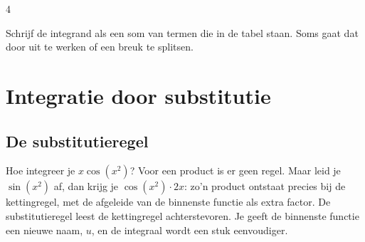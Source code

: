 \begin{alleenvoor}{4}

\end{alleenvoor}
\begin{werkwijze}
Schrijf de integrand als een som van termen die in de tabel staan. Soms gaat dat door uit te werken of een breuk te splitsen.
\end{werkwijze}


\begin{oefeningen}
\end{oefeningen}

\section{Integratie door substitutie}

\subsection{De substitutieregel}

Hoe integreer je $x\cos(x^2)$? Voor een product is er geen regel. Maar leid je $\sin(x^2)$ af, dan krijg je $\cos(x^2) \cdot 2x$: zo'n product ontstaat precies bij de kettingregel, met de afgeleide van de binnenste functie als extra factor. De substitutieregel leest de kettingregel achterstevoren. Je geeft de binnenste functie een nieuwe naam, $u$, en de integraal wordt een stuk eenvoudiger.



